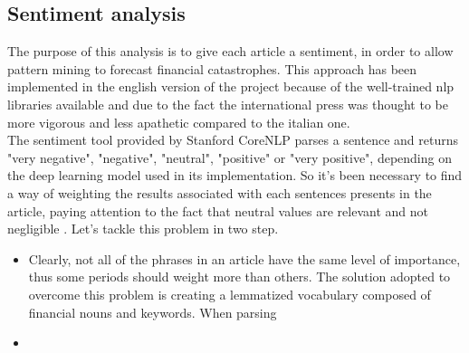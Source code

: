 \subsection{Sentiment analysis}
The purpose of this analysis is to give each article a sentiment, in order to allow pattern mining to forecast financial catastrophes. This approach has been implemented in the english version of the project because of the well-trained nlp libraries available and due to the fact the international press was thought to be more vigorous and less apathetic compared to the italian one. \\
The sentiment tool provided by Stanford CoreNLP parses a sentence and returns "very negative", "negative", "neutral", "positive" or "very positive", depending on the deep learning model \cite{sentimentdeep} used in its implementation. So it's been necessary to find a way of weighting the results associated with each sentences presents in the article, paying attention to the fact that neutral values are relevant and not negligible \cite{neutralvalues}. Let's tackle this problem in two step.
\begin{itemize}
\item
Clearly, not all of the phrases in an article have the same level of importance, thus some periods should weight more than others. The solution adopted to overcome this problem is creating a lemmatized vocabulary composed of financial nouns and keywords. When parsing  

\item

\end{itemize}


